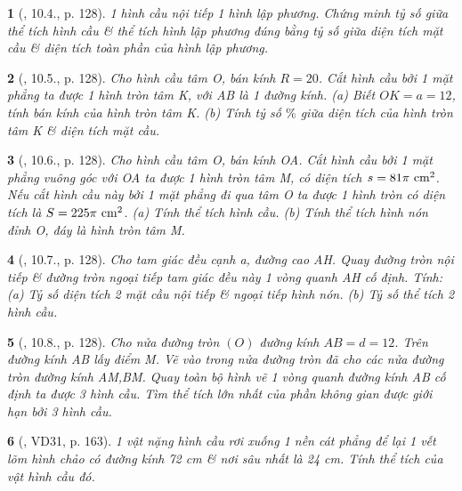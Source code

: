 \documentclass{article}
\newtheorem{baitoan}{}
\begin{document}
\begin{baitoan}[\cite{Binh_boi_duong_Toan_9_tap_2}, 10.4., p. 128]
	1 hình cầu nội tiếp 1 hình lập phương. Chứng minh tỷ số giữa thể tích hình cầu \& thể tích hình lập phương đúng bằng tỷ số giữa diện tích mặt cầu \& diện tích toàn phần của hình lập phương.
\end{baitoan}

\begin{baitoan}[\cite{Binh_boi_duong_Toan_9_tap_2}, 10.5., p. 128]
	Cho hình cầu tâm O, bán kính $R = 20$. Cắt hình cầu bởi 1 mặt phẳng ta được 1 hình tròn tâm K, với AB là 1 đường kính. (a) Biết $OK = a = 12$, tính bán kính của hình tròn tâm K. (b) Tính tỷ số $\%$ giữa diện tích của hình tròn tâm K \& diện tích mặt cầu.
\end{baitoan}

\begin{baitoan}[\cite{Binh_boi_duong_Toan_9_tap_2}, 10.6., p. 128]
	Cho hình cầu tâm O, bán kính OA. Cắt hình cầu bởi 1 mặt phẳng vuông góc với OA ta được 1 hình tròn tâm M, có diện tích $s = 81\pi\ {\rm cm}^2$. Nếu cắt hình cầu này bởi 1 mặt phẳng đi qua tâm O ta được 1 hình tròn có diện tích là $S = 225\pi\ {\rm cm}^2$. (a) Tính thể tích hình cầu. (b) Tính thể tích hình nón đỉnh O, đáy là hình tròn tâm M.
\end{baitoan}

\begin{baitoan}[\cite{Binh_boi_duong_Toan_9_tap_2}, 10.7., p. 128]
	Cho tam giác đều cạnh a, đường cao AH. Quay đường tròn nội tiếp \& đường tròn ngoại tiếp tam giác đều này 1 vòng quanh AH cố định. Tính: (a) Tỷ số diện tích 2 mặt cầu nội tiếp \& ngoại tiếp hình nón. (b) Tỷ số thể tích 2 hình cầu.
\end{baitoan}

\begin{baitoan}[\cite{Binh_boi_duong_Toan_9_tap_2}, 10.8., p. 128]
	Cho nửa đường tròn $(O)$ đường kính $AB = d = 12$. Trên đường kính AB lấy điểm M. Vẽ vào trong nửa đường tròn đã cho các nửa đường tròn đường kính AM,BM. Quay toàn bộ hình vẽ 1 vòng quanh đường kính AB cố định ta được 3 hình cầu. Tìm thể tích lớn nhất của phần không gian được giới hạn bởi 3 hình cầu.
\end{baitoan}

\begin{baitoan}[\cite{Tuyen_Toan_9_old}, VD31, p. 163]
	1 vật nặng hình cầu rơi xuống 1 nền cát phẳng để lại 1 vết lõm hình chảo có đường kính {\rm72 cm} \& nơi sâu nhất là {\rm24 cm}. Tính thể tích của vật hình cầu đó.
\end{baitoan}
\end{document}
